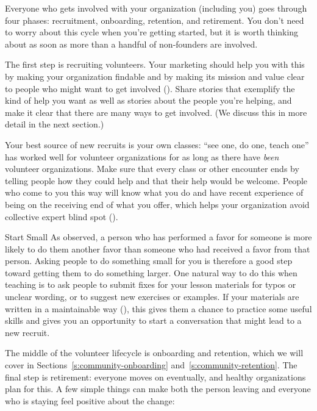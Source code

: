 
Everyone who gets involved with your organization
(including you)
goes through four phases:
recruitment, onboarding, retention, and retirement.
You don't need to worry about this cycle when you're getting started,
but it is worth thinking about
as soon as more than a handful of non-founders are involved.

The first step is recruiting volunteers.
Your marketing should help you with this by making your organization findable
and by making its mission and value clear
to people who might want to get involved
().
Share stories that exemplify the kind of help you want
as well as stories about the people you're helping,
and make it clear that there are many ways to get involved.
(We discuss this in more detail in the next section.)

Your best source of new recruits is your own classes:
``see one, do one, teach one'' has worked well for volunteer organizations
for as long as there have \emph{been} volunteer organizations.
Make sure that every class or other encounter
ends by telling people how they could help and that their help would be welcome.
People who come to you this way will know what you do
and have recent experience of being on the receiving end of what you offer,
which helps your organization avoid collective expert blind spot ().

\begin{aside}{Start Small}
  As  observed,
  a person who has performed a favor for someone
  is more likely to do them another favor
  than someone who had received a favor from that person.
  Asking people to do something small for you
  is therefore a good step toward getting them to do something larger.
  One natural way to do this when teaching
  is to ask people to submit fixes for your lesson materials for typos or unclear wording,
  or to suggest new exercises or examples.
  If your materials are written in a maintainable way (),
  this gives them a chance to practice some useful skills
  and gives you an opportunity to start a conversation
  that might lead to a new recruit.
\end{aside}

The middle of the volunteer lifecycle is onboarding and retention,
which we will cover in Sections~\ref{s:community-onboarding} and~\ref{s:community-retention}.
The final step is retirement:
everyone moves on eventually,
and healthy organizations plan for this.
A few simple things can make both the person leaving and everyone who is staying
feel positive about the change:

